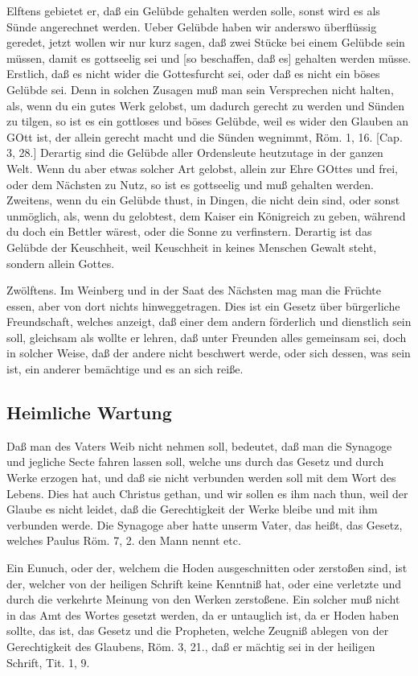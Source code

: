 Elftens gebietet er, daß ein Gelübde gehalten werden solle, sonst wird es als Sünde angerechnet werden. Ueber Gelübde haben wir anderswo überflüssig geredet, jetzt wollen wir nur kurz sagen, daß zwei Stücke bei einem Gelübde sein müssen, damit es gottseelig sei und [so beschaffen, daß es] gehalten werden müsse. Erstlich, daß es nicht wider die Gottesfurcht sei, oder daß es nicht ein böses Gelübde sei. Denn in solchen Zusagen muß man sein Versprechen nicht halten, als, wenn du ein gutes Werk gelobst, um dadurch gerecht zu werden und Sünden zu tilgen, so ist es ein gottloses und böses Gelübde, weil es wider den Glauben an GOtt ist, der allein gerecht macht und die Sünden wegnimmt, Röm. 1, 16. [Cap. 3, 28.] Derartig sind die Gelübde aller Ordensleute heutzutage in der ganzen Welt. Wenn du aber etwas solcher Art gelobst, allein zur Ehre GOttes und frei, oder dem Nächsten zu Nutz, so ist es gottseelig und muß gehalten werden. Zweitens, wenn du ein Gelübde thust, in Dingen, die nicht dein sind, oder sonst unmöglich, als, wenn du gelobtest, dem Kaiser ein Königreich zu geben, während du doch ein Bettler wärest, oder die Sonne zu verfinstern. Derartig ist das Gelübde der Keuschheit, weil Keuschheit in keines Menschen Gewalt steht, sondern allein Gottes.

Zwölftens. Im Weinberg und in der Saat des Nächsten mag man die Früchte essen, aber von dort nichts hinweggetragen. Dies ist ein Gesetz über bürgerliche Freundschaft, welches anzeigt, daß einer dem andern förderlich und dienstlich sein soll, gleichsam als wollte er lehren, daß unter Freunden alles gemeinsam sei, doch in solcher Weise, daß der andere nicht beschwert werde, oder sich dessen, was sein ist, ein anderer bemächtige und es an sich reiße.

\subsection{Heimliche Wartung}

Daß man des Vaters Weib nicht nehmen soll, bedeutet, daß man die Synagoge und jegliche Secte fahren lassen soll, welche uns durch das Gesetz und durch Werke erzogen hat, und daß sie nicht verbunden werden soll mit dem Wort des Lebens. Dies hat auch Christus gethan, und wir sollen es ihm nach thun, weil der Glaube es nicht leidet, daß die Gerechtigkeit der Werke bleibe und mit ihm verbunden werde. Die Synagoge aber hatte unserm Vater, das heißt, das Gesetz, welches Paulus Röm. 7, 2. den Mann nennt etc.

Ein Eunuch, oder der, welchem die Hoden ausgeschnitten oder zerstoßen sind, ist der, welcher von der heiligen Schrift keine Kenntniß hat, oder eine verletzte und durch die verkehrte Meinung von den Werken zerstoßene. Ein solcher muß nicht in das Amt des Wortes gesetzt werden, da er untauglich ist, da er Hoden haben sollte, das ist, das Gesetz und die Propheten, welche Zeugniß ablegen von der Gerechtigkeit des Glaubens, Röm. 3, 21., daß er mächtig sei in der heiligen Schrift, Tit. 1, 9.

